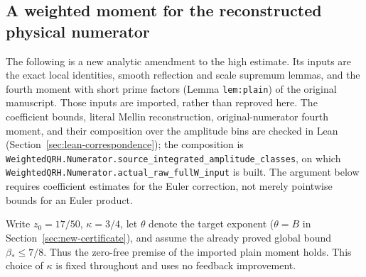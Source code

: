 \subsection{A weighted moment for the reconstructed physical numerator}
\label{sec:new-weighted-numerator}

The following is a new analytic amendment to the high estimate.  Its
inputs are the exact local identities, smooth reflection and scale
supremum lemmas, and the fourth moment with short prime factors
\textup{(Lemma \texttt{lem:plain})} of the original manuscript.  Those
inputs are imported, rather than reproved here. The coefficient bounds,
literal Mellin reconstruction, original-numerator fourth moment, and
their composition over the amplitude bins are checked in Lean
(Section~\ref{sec:lean-correspondence}); the composition is
\nolinkurl{WeightedQRH.Numerator.source_integrated_amplitude_classes},
on which \nolinkurl{WeightedQRH.Numerator.actual_raw_fullW_input} is
built. The argument below requires coefficient estimates for the Euler
correction, not merely pointwise bounds for an Euler product.

Write $z_0=17/50$, $\kappa=3/4$, let $\theta$ denote the target exponent
($\theta=B$ in Section~\ref{sec:new-certificate}), and assume the
already proved global bound $\beta_*\le7/8$.  Thus the zero-free premise of the imported plain
moment holds.  This choice of $\kappa$ is fixed throughout and uses no
feedback improvement.

